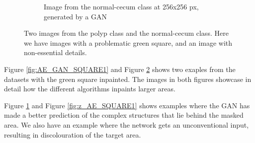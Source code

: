\begin{figure}
\begin{subfigure}[t]{0.4\textwidth}
            \caption{Image from the normal-cecum class at 256x256 px, generated by a GAN }  
            \label{fig:nc_GAN_SQUARE2}
        \end{subfigure}
        \caption{Two images from the polyp class and the normal-cecum class. Here we have images with a problematic green square, and an image with non-essential details.} 
        \label{fig:AE_GAN_SQUARE2}
    \end{figure}
    
Figure \ref{fig:AE_GAN_SQUARE1} and Figure \ref{fig:AE_GAN_SQUARE2} shows two exaples from the datasets with the green square inpainted.
The images in both figures showcase in detail how the different algorithms inpaints larger areas. 

Figure \ref{fig:nc_GAN_SQUARE2} and Figure \ref{fig:z_AE_SQUARE1} shows examples where the GAN has made a better prediction of the complex structures that lie behind the masked area.
We also have an example where the network gets an unconventional input, resulting in discolouration of the target area.         
